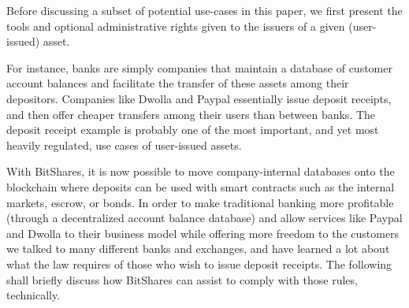 \label{sec:uia:restrictions}

Before discussing a subset of potential use-cases in this paper, we first
present the tools and optional administrative rights given to the issuers of a
given (user-issued) asset.

For instance, banks are simply companies that maintain a database of customer
account balances and facilitate the transfer of these assets among their
depositors. Companies like Dwolla and Paypal essentially issue deposit
receipts, and then offer cheaper transfers among their users than between
banks. The deposit receipt example is probably one of the most important, and
yet most heavily regulated, use cases of user-issued assets.

With BitShares, it is now possible to move company-internal databases onto the
blockchain where deposits can be used with smart contracts such as the internal
markets, escrow, or bonds. In order to make traditional banking more profitable
(through a decentralized account balance database) and allow services like
Paypal and Dwolla to their business model while offering more freedom to the
customers we talked to many different banks and exchanges, and have learned a
lot about what the law requires of those who wish to issue deposit receipts.
The following shall briefly discuss how BitShares can assist to comply with
those rules, technically.
